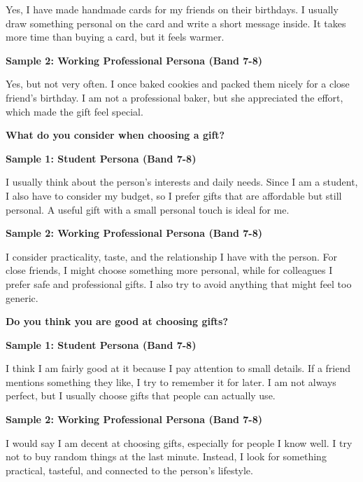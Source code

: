 Yes, I have made handmade cards for my friends on their birthdays. I usually draw something personal on the card and write a short message inside. It takes more time than buying a card, but it feels warmer.

\textbf{Sample 2: Working Professional Persona (Band 7-8)}

Yes, but not very often. I once baked cookies and packed them nicely for a close friend's birthday. I am not a professional baker, but she appreciated the effort, which made the gift feel special.

\separator

\begin{ieltsquestion}
\textbf{What do you consider when choosing a gift?}
\end{ieltsquestion}
\textbf{Sample 1: Student Persona (Band 7-8)}

I usually think about the person's interests and daily needs. Since I am a student, I also have to consider my budget, so I prefer gifts that are affordable but still personal. A useful gift with a small personal touch is ideal for me.

\textbf{Sample 2: Working Professional Persona (Band 7-8)}

I consider practicality, taste, and the relationship I have with the person. For close friends, I might choose something more personal, while for colleagues I prefer safe and professional gifts. I also try to avoid anything that might feel too generic.

\separator

\begin{ieltsquestion}
\textbf{Do you think you are good at choosing gifts?}
\end{ieltsquestion}
\textbf{Sample 1: Student Persona (Band 7-8)}

I think I am fairly good at it because I pay attention to small details. If a friend mentions something they like, I try to remember it for later. I am not always perfect, but I usually choose gifts that people can actually use.

\textbf{Sample 2: Working Professional Persona (Band 7-8)}

I would say I am decent at choosing gifts, especially for people I know well. I try not to buy random things at the last minute. Instead, I look for something practical, tasteful, and connected to the person's lifestyle.

\separator


